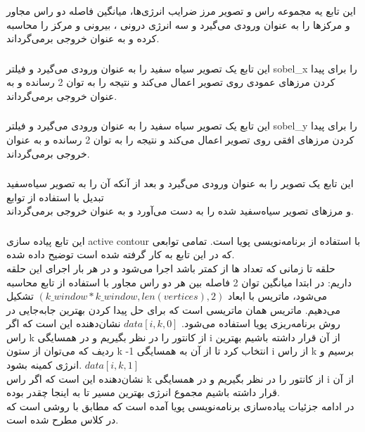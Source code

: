 \documentclass[a4paper,12pt]{article}
\begin{document}
	\subsubsection*{}
	این تابع یه مجموعه راس و تصویر مرز ضرایب انرژی‌ها، میانگین فاصله دو راس مجاور و مرکزها را به عنوان ورودی می‌گیرد و سه انرژی درونی ، بیرونی و مرکز را محاسبه کرده و به عنوان خروجی بر‌می‌گرداند.
	\subsubsection*{}
	این تابع یک تصویر سیاه سفید را به عنوان ورودی می‌گیرد و فیلتر sobel\_x را برای پیدا کردن مرزهای عمودی روی تصویر اعمال می‌کند و نتیجه را به توان 2 رسانده و به عنوان خروجی بر‌می‌گرداند.
	\subsubsection*{}
	این تابع یک تصویر سیاه سفید را به عنوان ورودی می‌گیرد و فیلتر sobel\_y را برای پیدا کردن مرزهای افقی روی تصویر اعمال می‌کند و نتیجه را به توان 2 رسانده و به عنوان خروجی بر‌می‌گرداند.
	\subsubsection*{}
	این تابع یک تصویر را به عنوان ورودی می‌گیرد و بعد از آنکه آن را به تصویر سیاه‌سفید تبدیل با استفاده از توابع \\
	 و 
	مرزهای تصویر سیاه‌سفید شده را به دست می‌آورد و به عنوان خروجی بر‌می‌گرداند.
	\subsubsection*{}
	این تابع پیاده سازی active contour با استفاده از برنامه‌نویسی پویا است. تمامی توابعی که در این تابع به کار گرفته شده است توضیح داده شده.\\
	حلقه
	تا زمانی که تعداد 
	ها از 
	کمتر باشد اجرا می‌شود و در هر بار اجرای این حلقه داریم: در ابتدا میانگین توان 2 فاصله بین هر دو راس مجاور با استفاده از تابع 
	محاسبه می‌شود، ماتریس 
	با ابعاد 
	$ (k\_window * k\_window, len(vertices), 2) $
	تشکیل می‌دهیم. ماتریس 
	همان ماتریسی است که برای حل پیدا کردن بهترین جابه‌جایی در روش برنامه‌ریزی پویا استفاده می‌شود.
	$ data[i, k, 0] $
	نشان‌دهنده این است که اگر راس k از کانتور را در نظر بگیریم و در همسایگی i از آن قرار داشته باشیم بهترین ردیف که می‌توان از ستون k -1 انتخاب کرد تا  از آن به همسایگی i از راس k برسیم و انرژی کمینه بشود. 
	$ data[i, k, 1] $\\
	نشان‌دهنده این است که اگر راس k از کانتور را در نظر بگیریم و در همسایگی i از آن قرار داشته باشیم مجموع انرژی بهترین مسیر تا به اینجا چقدر بوده.\\
	در ادامه جزئیات پیاده‌سازی برنامه‌نویسی پویا آمده است که مطابق با روشی است که در کلاس مطرح شده است.
\end{document}
